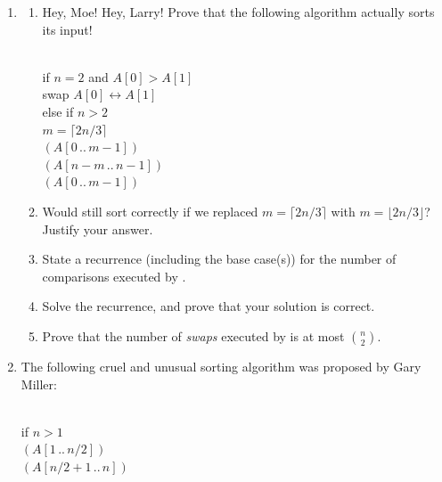 \begin{exercises}
\begin{enumerate}[label=\arabic*.,ref=\thechapter.\arabic*,leftmargin=*,align=left,itemsep=1.5ex plus 0.5ex,resume]
\begin{enumerate}
\item As a warm-up exercise, assume that the  subroutine is \emph{stable}, meaning it preserves the existing order of all elements smaller than the pivot, and it preserves the existing order of all elements smaller than the pivot.
\item {} Assume that the  subroutine uses the specific algorithm listed on page 29, which is \emph{not} stable.
\end{enumerate}
\item
\begin{enumerate}
\item Hey, Moe! Hey, Larry! Prove that the following algorithm actually sorts its input!
\begin{pseudocode}
\\
if $n = 2$ and $A[0] > A[1]$\\
\Indent swap $A[0] \leftrightarrow A[1]$\\
else if $n > 2$\\
\Indent $m = \lceil 2n/3\rceil$\\
\Indent {}$(A[0\,..\,m-1])$\\
\Indent {}$(A[n-m\,..\,n-1])$\\
\Indent {}$(A[0\,..\,m-1])$
\end{pseudocode}
\item Would  still sort correctly if we replaced $m = \lceil 2n/3\rceil$ with $m = \lfloor 2n/3\rfloor$? Justify your answer.
\item State a recurrence (including the base case(s)) for the number of comparisons executed by .
\item Solve the recurrence, and prove that your solution is correct. 
\item Prove that the number of \emph{swaps} executed by  is at most $\binom{n}{2}$.
\end{enumerate}
\item The following cruel and unusual sorting algorithm was proposed by Gary Miller:
\begin{pseudocode}
\\
if $n > 1$\\
\Indent {}$(A[1\,..\,n/2])$\\
\Indent {}$(A[n/2+1\,..\,n])$\\

\end{pseudocode}
\end{enumerate}
\end{exercises}
